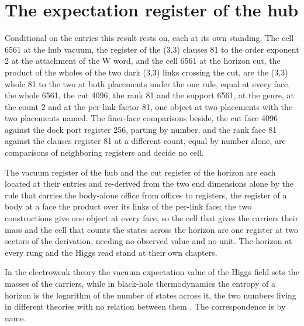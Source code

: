 \section{The expectation register of the hub}\label{mod:X-3-D540711-crgv-t1}
\begin{chconditional}\label{box:X-3-D540711-crgv-t1:1}
Conditional on the entries this result rests on, each at its own standing. The cell 6561 at the hub vacuum, the register of the (3,3) clauses 81 to the order exponent 2 at the attachment of the W word, and the cell 6561 at the horizon cut, the product of the wholes of the two dark (3,3) links crossing the cut, are the (3,3) whole 81 to the two at both placements under the one rule, equal at every face, the whole 6561, the cut 4096, the rank 81 and the support 6561, at the genre, at the count 2 and at the per-link factor 81, one object at two placements with the two placements named. The finer-face comparisons beside, the cut face 4096 against the dock port register 256, parting by number, and the rank face 81 against the clauses register 81 at a different count, equal by number alone, are comparisons of neighboring registers and decide no cell.
\end{chconditional}
The vacuum register of the hub and the cut register of the horizon are each located at their entries and re-derived from the two end dimensions alone by the rule that carries the body-alone office from offices to registers, the register of a body at a face the product over its links of the per-link face; the two constructions give one object at every face, so the cell that gives the carriers their mass and the cell that counts the states across the horizon are one register at two sectors of the derivation, needing no observed value and no unit. The horizon at every rung and the Higgs read stand at their own chapters.
\begin{chbridge}
In the electroweak theory the vacuum expectation value of the Higgs field sets the masses of the carriers, while in black-hole thermodynamics the entropy of a horizon is the logarithm of the number of states across it, the two numbers living in different theories with no relation between them \cite{Weinberg1967,Bekenstein1973}. The correspondence is by name.
\end{chbridge}
